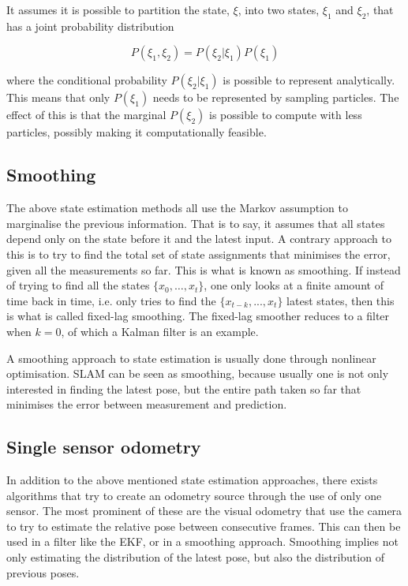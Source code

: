 It assumes it is possible to partition the state, $\xi$, into two states, $\xi_1$ and $\xi_2$, that has a joint probability distribution 

\begin{equation}
    P(\xi_1,\xi_2) = P(\xi_2|\xi_1)P(\xi_1)
\end{equation}

where the conditional probability $P(\xi_2|\xi_1)$ is possible to represent analytically. This means that only $P(\xi_1)$ needs to be represented by sampling particles. The effect of this is that the marginal $P(\xi_2)$ is possible to compute with less particles, possibly making it computationally feasible.

\subsection{Smoothing}

The above state estimation methods all use the Markov assumption to marginalise the previous information. That is to say, it assumes that all states depend only on the state before it and the latest input. A contrary approach to this is to try to find the total set of state assignments that minimises the error, given all the measurements so far. This is what is known as smoothing. If instead of trying to find all the states $\{x_0,\dots,x_t\}$, one only looks at a finite amount of time back in time, i.e. only tries to find the $\{x_{t-k},...,x_{t}\}$ latest states, then this is what is called fixed-lag smoothing. The fixed-lag smoother reduces to a filter when $k=0$, of which a Kalman filter is an example.

A smoothing approach to state estimation is usually done through nonlinear optimisation. SLAM can be seen as smoothing, because usually one is not only interested in finding the latest pose, but the entire path taken so far that minimises the error between measurement and prediction. 

\subsection{Single sensor odometry}

In addition to the above mentioned state estimation approaches, there exists algorithms that try to create an odometry source through the use of only one sensor. The most prominent of these are the visual odometry that use the camera to try to estimate the relative pose between consecutive frames. This can then be used in a filter like the EKF, or in a smoothing approach. Smoothing implies not only estimating the distribution of the latest pose, but also the distribution of previous poses. 

